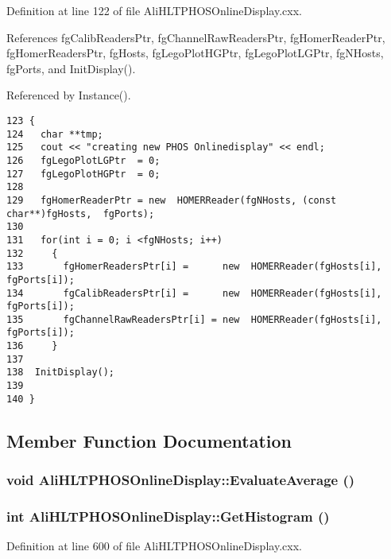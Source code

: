 Definition at line 122 of file Ali\-HLTPHOSOnline\-Display.cxx.

References fg\-Calib\-Readers\-Ptr, fg\-Channel\-Raw\-Readers\-Ptr, fg\-Homer\-Reader\-Ptr, fg\-Homer\-Readers\-Ptr, fg\-Hosts, fg\-Lego\-Plot\-HGPtr, fg\-Lego\-Plot\-LGPtr, fg\-NHosts, fg\-Ports, and Init\-Display().

Referenced by Instance().

\footnotesize\begin{verbatim}123 {
124   char **tmp;
125   cout << "creating new PHOS Onlinedisplay" << endl;
126   fgLegoPlotLGPtr  = 0;
127   fgLegoPlotHGPtr  = 0;
128 
129   fgHomerReaderPtr = new  HOMERReader(fgNHosts, (const char**)fgHosts,  fgPorts);
130 
131   for(int i = 0; i <fgNHosts; i++)
132     {
133       fgHomerReadersPtr[i] =      new  HOMERReader(fgHosts[i], fgPorts[i]); 
134       fgCalibReadersPtr[i] =      new  HOMERReader(fgHosts[i], fgPorts[i]);
135       fgChannelRawReadersPtr[i] = new  HOMERReader(fgHosts[i], fgPorts[i]);
136     }
137  
138  InitDisplay();
139 
140 }
\end{verbatim}\normalsize 




\subsection{Member Function Documentation}
\subsubsection{\setlength{\rightskip}{0pt plus 5cm}void Ali\-HLTPHOSOnline\-Display::Evaluate\-Average ()}\label{classAliHLTPHOSOnlineDisplay_a8}


\subsubsection{\setlength{\rightskip}{0pt plus 5cm}int Ali\-HLTPHOSOnline\-Display::Get\-Histogram ()}\label{classAliHLTPHOSOnlineDisplay_a3}




Definition at line 600 of file Ali\-HLTPHOSOnline\-Display.cxx.

